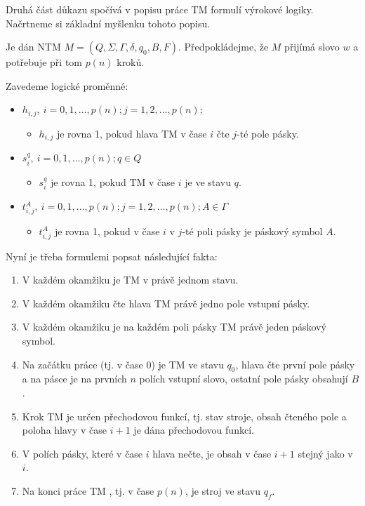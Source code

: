 Druhá část důkazu spočívá v popisu práce TM formulí výrokové logiky. Načrtneme si základní myšlenku tohoto popisu.

Je dán NTM $M = (Q,\Sigma, \Gamma, \delta, 
q_0, B, F)$. Předpokládejme, že $M$ přijímá slovo $w$ a potřebuje při tom $p(n)$ kroků.

Zavedeme logické proměnné:

\begin{itemize}[itemsep=0pt]
    \item $h_{i,j},~i = 0, 1, \hdots, p(n); j = 1, 2, \hdots, p(n);$
    \begin{itemize}[itemsep=0pt]
        \item $h_{i,j}$ je rovna 1, pokud hlava TM v čase $i$ čte $j$-té pole pásky.
    \end{itemize}
    
    \item $s^{q}_{i},~i = 0, 1, \hdots, p(n); q \in Q$
    \begin{itemize}[itemsep=0pt]
        \item $s^{q}_{i}$ je rovna 1, pokud TM v čase $i$ je ve stavu $q$.
    \end{itemize}
    
    \item $t^{A}_{i,j},~i = 0, 1, \hdots, p(n); j = 1, 2, \hdots, p(n); A \in \Gamma$
    \begin{itemize}[itemsep=0pt]
        \item $t^{A}_{i,j}$ je rovna 1, pokud v čase $i$ v $j$-té poli pásky je páskový symbol $A$.
    \end{itemize}
\end{itemize}

\noindent Nyní je třeba formulemi popsat následující fakta:

\begin{enumerate}
    \item V každém okamžiku je TM v právě jednom stavu.
    \item V každém okamžiku čte hlava TM právě jedno pole vstupní pásky.
    \item V každém okamžiku je na každém poli pásky TM právě jeden páskový symbol.
    \item Na začátku práce (tj. v čase 0) je TM ve stavu $q_0$, hlava čte první pole pásky a na pásce je na prvních $n$ polích vstupní slovo, ostatní pole pásky obsahují $B$.
    \item Krok TM je určen přechodovou funkcí, tj. stav stroje, obsah čteného pole a poloha hlavy v čase $i + 1$ je dána přechodovou funkcí.
    \item V polích pásky, které v čase $i$ hlava nečte, je obsah v čase $i + 1$ stejný jako v $i$.
    \item Na konci práce TM , tj. v čase $p(n)$, je stroj ve stavu $q_f$.
\end{enumerate}

